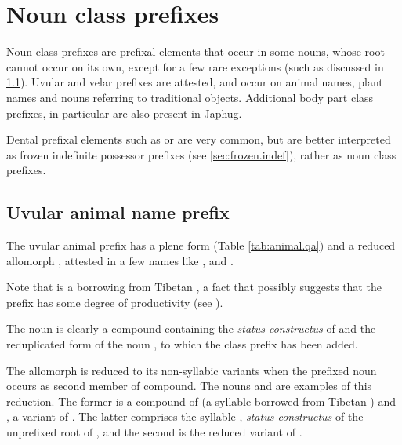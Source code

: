  

\section{Noun class prefixes} \label{sec:class.prefixes}
Noun class prefixes are prefixal elements that occur in some nouns, whose root cannot occur on its own, except for a few rare exceptions (such as  discussed in \ref{sec:uvular.animal}). Uvular  and velar  prefixes are attested, and occur on animal names, plant names and nouns referring to traditional objects. Additional body part class prefixes, in particular  are also present in Japhug.

Dental prefixal elements such as  or  are very common, but  are  better interpreted as frozen indefinite possessor prefixes (see \ref{sec:frozen.indef}), rather as noun class prefixes.

\subsection{Uvular animal name prefix} \label{sec:uvular.animal}
The uvular animal prefix has a plene form  (Table \ref{tab:animal.qa}) and a reduced allomorph , attested in a few names like ,  and .

Note that  is a borrowing from Tibetan , a fact that possibly suggests that the  prefix has some degree of productivity (see \citealt{jacques14snom}). 

The noun  is clearly a compound containing the \textit{status constructus} of  and the reduplicated form of the noun , to which the class prefix  has been added.

The allomorph  is reduced to its non-syllabic variants  when the prefixed noun occurs as second member of compound. The nouns  and  are examples of this reduction. The former is a compound of  (a syllable borrowed  from Tibetan ) and , a variant of . The latter comprises the syllable , \textit{status constructus} of the unprefixed root of , and the second  is the reduced variant of .

